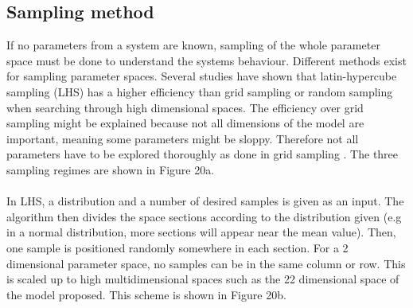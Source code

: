 \subsection{Sampling method}
If no parameters from a system are known, sampling of the whole parameter space must be done to understand the systems behaviour. Different methods exist for sampling parameter spaces. Several studies have shown that latin-hypercube sampling (LHS) has a higher efficiency than grid sampling or random sampling when searching through high dimensional spaces. The efficiency over grid sampling might be explained because not all dimensions of the model are important, meaning some parameters might be sloppy. Therefore not all parameters have to be explored thoroughly as done in grid sampling \parencite{iman1980latin, Bergstra2012}. The three sampling regimes are shown in Figure 20a.\\\\
In LHS, a distribution and a number of desired samples is given as an input. The algorithm then divides the space sections according to the distribution given (e.g in a normal distribution, more sections will appear near the mean value).  Then, one sample is positioned randomly somewhere in each section. For a 2 dimensional parameter space, no samples can be in the same column or row. This is scaled up to high multidimensional spaces such as the 22 dimensional space of the model proposed. This scheme is shown in Figure 20b.
